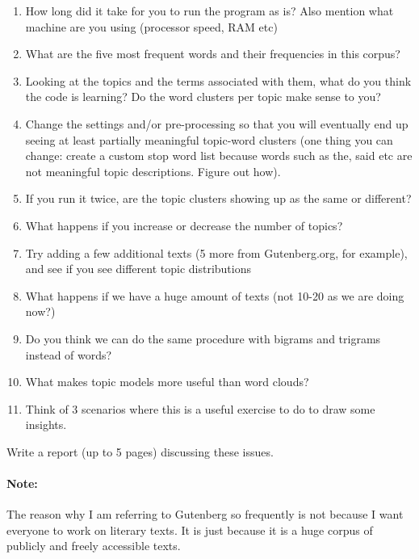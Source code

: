 \documentclass[11pt,a4paper]{article}
\begin{document}
\begin{enumerate}
\item How long did it take for you to run the program as is? Also mention what machine are you using (processor speed, RAM etc)
\item What are the five most frequent words and their frequencies in this corpus? 
\item Looking at the topics and the terms associated with them, what do you think the code is learning? Do the word clusters per topic make sense to you?
\item Change the settings and/or pre-processing so that you will eventually end up seeing at least partially meaningful topic-word clusters (one thing you can change: create a custom stop word list because words such as the, said etc are not meaningful topic descriptions. Figure out how).
\item If you run it twice, are the topic clusters showing up as the same or different? 
\item What happens if you increase or decrease the number of topics?
\item Try adding a few additional texts (5 more from Gutenberg.org, for example), and see if you see different topic distributions
\item What happens if we have a huge amount of texts (not 10-20 as we are doing now?)
\item Do you think we can do the same procedure with bigrams and trigrams instead of words? 
\item What makes topic models more useful than word clouds?
\item Think of 3 scenarios where this is a useful exercise to do to draw some insights.
\end{enumerate}
Write a report (up to 5 pages) discussing these issues. 

\paragraph{Note: } The reason why I am referring to Gutenberg so frequently is not because I want everyone to work on literary texts. It is just because it is a huge corpus of publicly and freely accessible texts. 

\end{document}
